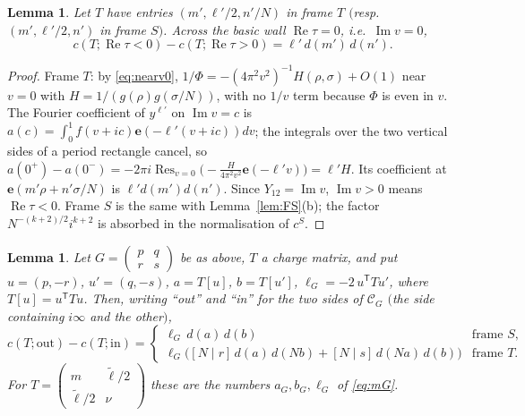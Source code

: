 \documentclass[11pt]{amsart}
\numberwithin{equation}{section}
\theoremstyle{plain}
\newtheorem{lem}[thm]{Lemma}
\theoremstyle{definition}
\theoremstyle{remark}
\newcommand{\e}{\mathbf{e}}
\newcommand{\sm}[4]{\left(\begin{smallmatrix}#1&#2\\#3&#4\end{smallmatrix}\right)}
\begin{document}
\begin{lem}\label{lem:jump0}
Let $T$ have entries $(m',\ell'/2,n'/N)$ in frame $T$ $($resp.\ $(m',\ell'/2,n')$ in frame $S)$. Across the basic wall $\operatorname{Re}\tau=0$, i.e.\ $\operatorname{Im}v=0$,
\[
c(T;\operatorname{Re}\tau<0)-c(T;\operatorname{Re}\tau>0)=\ell'\,d(m')\,d(n').
\]
\end{lem}

\begin{proof}
Frame $T$: by \eqref{eq:nearv0}, $1/\Phi=-(4\pi^2v^2)^{-1}H(\rho,\sigma)+O(1)$ near $v=0$ with $H=1/(g(\rho)g(\sigma/N))$, with no $1/v$ term because $\Phi$ is even in $v$. The Fourier coefficient of $y^{\ell'}$ on $\operatorname{Im}v=c$ is $a(c)=\int_0^1f(v+ic)\e(-\ell'(v+ic))dv$; the integrals over the two vertical sides of a period rectangle cancel, so $a(0^+)-a(0^-)=-2\pi i\operatorname{Res}_{v=0}\bigl(-\tfrac{H}{4\pi^2v^2}\e(-\ell'v)\bigr)=\ell'H$. Its coefficient at $\e(m'\rho+n'\sigma/N)$ is $\ell'd(m')d(n')$. Since $Y_{12}=\operatorname{Im}v$, $\operatorname{Im}v>0$ means $\operatorname{Re}\tau<0$. Frame $S$ is the same with Lemma~\ref{lem:FS}(b); the factor $N^{-(k+2)/2}i^{k+2}$ is absorbed in the normalisation of $c^S$.
\end{proof}

\begin{lem}\label{lem:jumpG}
Let $G=\sm pqrs$ be as above, $T$ a charge matrix, and put $u=(p,-r)$, $u'=(q,-s)$, $a=T[u]$, $b=T[u']$, $\ell_G=-2\,u^{\mathsf T}Tu'$, where $T[u]=u^{\mathsf T}Tu$. Then, writing ``out'' and ``in'' for the two sides of $\mathcal C_G$ $($the side containing $i\infty$ and the other$)$,
\[
c(T;\mathrm{out})-c(T;\mathrm{in})=\begin{cases}\ell_G\,d(a)\,d(b)&\text{frame }S,\\ \ell_G\bigl([N\mid r]\,d(a)\,d(Nb)+[N\mid s]\,d(Na)\,d(b)\bigr)&\text{frame }T.\end{cases}
\]
For $T=\sm m{\tilde\ell/2}{\tilde\ell/2}{\nu}$ these are the numbers $a_G,b_G,\ell_G$ of \eqref{eq:mG}.
\end{lem}
\end{document}
